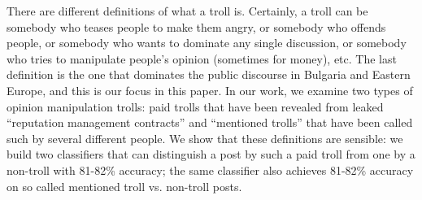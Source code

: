 There are different definitions of what a troll is. Certainly, a troll can be somebody who teases people to make them angry, or somebody who offends people, or somebody who wants to dominate any single discussion, or somebody who tries to manipulate people's opinion (sometimes for money), etc. The last definition is the one that dominates the public discourse in Bulgaria and Eastern Europe, and this is our focus in this paper. In our work, we examine two types of opinion manipulation trolls: paid trolls that have been revealed from leaked ``reputation management contracts'' and ``mentioned trolls'' that have been called such by several different people. We show that these definitions are sensible: we build two classifiers that can distinguish a post by such a paid troll from one by a non-troll with 81-82\% accuracy; the same classifier also achieves 81-82\% accuracy on so called mentioned troll vs. non-troll posts.
